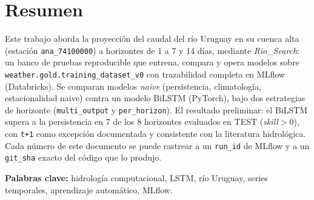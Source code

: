 \documentclass{../common/riosearch}
\begin{document}
\makeriosearchcover

\tableofcontents
\newpage

\section*{Resumen}

Este trabajo aborda la proyecci\'on del caudal del r\'io Uruguay en su cuenca alta (estaci\'on
\texttt{ana\_74100000}) a horizontes de 1 a 7 y 14 d\'ias, mediante \emph{Rio\_Search}: un banco de
pruebas reproducible que entrena, compara y opera modelos sobre
\texttt{weather.gold.training\_dataset\_v0} con trazabilidad completa en MLflow (Databricks). Se
comparan modelos \emph{naive} (persistencia, climatolog\'ia, estacionalidad naive) contra un modelo
BiLSTM (PyTorch), bajo dos estrategias de horizonte (\texttt{multi\_output} y
\texttt{per\_horizon}). El resultado preliminar: el BiLSTM supera a la persistencia en 7 de los 8
horizontes evaluados en TEST (\emph{skill}$>0$), con \texttt{t+1} como excepci\'on documentada y
consistente con la literatura hidrol\'ogica. Cada n\'umero de este documento se puede rastrear a un
\texttt{run\_id} de MLflow y a un \texttt{git\_sha} exacto del c\'odigo que lo produjo.

\textbf{Palabras clave:} hidrolog\'ia computacional, LSTM, r\'io Uruguay, series temporales,
aprendizaje autom\'atico, MLflow.

\newpage







\cleardoublepage
\riosearchbibliography
\end{document}
